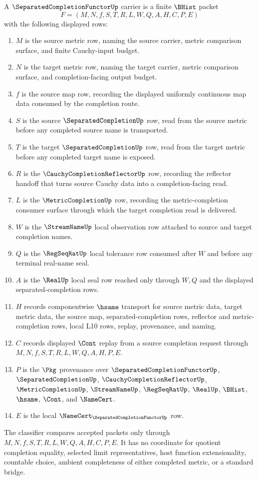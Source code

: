 \begin{definition}
\label{def:separated-completion-functor-carrier}
A $\SeparatedCompletionFunctorUp$ carrier is a finite $\BHist$ packet
$$
F=(M,N,f,S,T,R,L,W,Q,A,H,C,P,E)
$$
with the following displayed rows:
\begin{enumerate}
\item $M$ is the source metric row, naming the source carrier, metric comparison surface, and finite Cauchy-input budget.
\item $N$ is the target metric row, naming the target carrier, metric comparison surface, and completion-facing output budget.
\item $f$ is the source map row, recording the displayed uniformly continuous map data consumed by the completion route.
\item $S$ is the source $\SeparatedCompletionUp$ row, read from the source metric before any completed source name is transported.
\item $T$ is the target $\SeparatedCompletionUp$ row, read from the target metric before any completed target name is exposed.
\item $R$ is the $\CauchyCompletionReflectorUp$ row, recording the reflector handoff that turns source Cauchy data into a completion-facing read.
\item $L$ is the $\MetricCompletionUp$ row, recording the metric-completion consumer surface through which the target completion read is delivered.
\item $W$ is the $\StreamNameUp$ local observation row attached to source and target completion names.
\item $Q$ is the $\RegSeqRatUp$ local tolerance row consumed after $W$ and before any terminal real-name seal.
\item $A$ is the $\RealUp$ local seal row reached only through $W,Q$ and the displayed separated-completion rows.
\item $H$ records componentwise $\hsame$ transport for source metric data, target metric data, the source map, separated-completion rows, reflector and metric-completion rows, local L10 rows, replay, provenance, and naming.
\item $C$ records displayed $\Cont$ replay from a source completion request through $M,N,f,S,T,R,L,W,Q,A,H,P,E$.
\item $P$ is the $\Pkg$ provenance over $\SeparatedCompletionFunctorUp$, $\SeparatedCompletionUp$, $\CauchyCompletionReflectorUp$, $\MetricCompletionUp$, $\StreamNameUp$, $\RegSeqRatUp$, $\RealUp$, $\BHist$, $\hsame$, $\Cont$, and $\NameCert$.
\item $E$ is the local $\NameCert_{\SeparatedCompletionFunctorUp}$ row.
\end{enumerate}
The classifier compares accepted packets only through $M,N,f,S,T,R,L,W,Q,A,H,C,P,E$. It has no coordinate for quotient completion equality, selected limit representatives, host function extensionality, countable choice, ambient completeness of either completed metric, or a standard bridge.
\end{definition}

